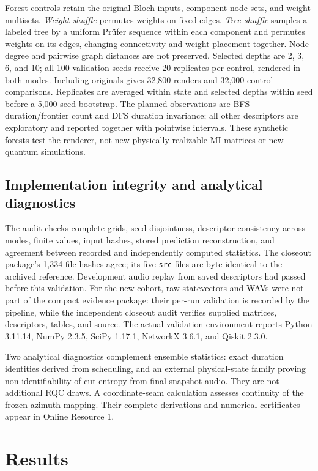 \documentclass[pdflatex,iicol,sn-basic,Numbered]{sn-jnl}
\begin{document}
Forest controls retain the original Bloch inputs, component node sets, and weight multisets. \emph{Weight shuffle} permutes weights on fixed edges. \emph{Tree shuffle} samples a labeled tree by a uniform Pr\"ufer sequence within each component and permutes weights on its edges, changing connectivity and weight placement together. Node degree and pairwise graph distances are not preserved. Selected depths are 2, 3, 6, and 10; all 100 validation seeds receive 20 replicates per control, rendered in both modes. Including originals gives 32,800 renders and 32,000 control comparisons. Replicates are averaged within state and selected depths within seed before a 5,000-seed bootstrap. The planned observations are BFS duration/frontier count and DFS duration invariance; all other descriptors are exploratory and reported together with pointwise intervals. These synthetic forests test the renderer, not new physically realizable MI matrices or new quantum simulations.

\subsection{Implementation integrity and analytical diagnostics}
The audit checks complete grids, seed disjointness, descriptor consistency across modes, finite values, input hashes, stored prediction reconstruction, and agreement between recorded and independently computed statistics. The closeout package's 1,334 file hashes agree; its five \texttt{src} files are byte-identical to the archived reference. Development audio replay from saved descriptors had passed before this validation. For the new cohort, raw statevectors and WAVs were not part of the compact evidence package: their per-run validation is recorded by the pipeline, while the independent closeout audit verifies supplied matrices, descriptors, tables, and source. The actual validation environment reports Python 3.11.14, NumPy 2.3.5, SciPy 1.17.1, NetworkX 3.6.1, and Qiskit 2.3.0.

Two analytical diagnostics complement ensemble statistics: exact duration identities derived from scheduling, and an external physical-state family proving non-identifiability of cut entropy from final-snapshot audio. They are not additional RQC draws. A coordinate-seam calculation assesses continuity of the frozen azimuth mapping. Their complete derivations and numerical certificates appear in Online Resource 1.

\section{Results}\label{sec:results}
\end{document}
